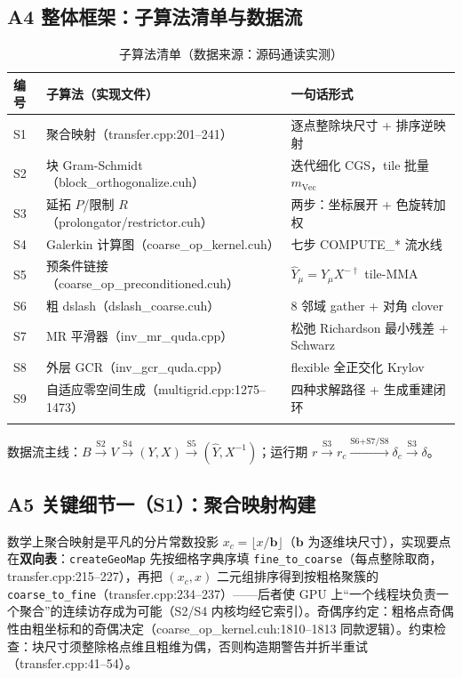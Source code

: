 \documentclass[UTF8]{ctexart}
\begin{document}
\subsection{A4 整体框架：子算法清单与数据流}

\begin{xltabular}{\textwidth}{llX}
\toprule
\textcolor{struct}{编号} & 子算法（实现文件） & \textcolor{struct}{一句话形式} \\
\midrule
\endhead
S1 & 聚合映射（transfer.cpp:201--241） & 逐点整除块尺寸 + 排序逆映射 \\
S2 & 块 Gram-Schmidt（block\_orthogonalize.cuh） & 迭代细化 CGS，tile 批量 $m_{\text{Vec}}$ \\
S3 & 延拓 $P$/限制 $R$（prolongator/restrictor.cuh） & 两步：坐标展开 + 色旋转加权 \\
S4 & Galerkin 计算图（coarse\_op\_kernel.cuh） & 七步 COMPUTE\_* 流水线 \\
S5 & 预条件链接（coarse\_op\_preconditioned.cuh） & $\hat Y_\mu=Y_\mu X^{-\dagger}$ tile-MMA \\
S6 & 粗 dslash（dslash\_coarse.cuh） & 8 邻域 gather + 对角 clover \\
S7 & MR 平滑器（inv\_mr\_quda.cpp） & 松弛 Richardson 最小残差 + Schwarz \\
S8 & 外层 GCR（inv\_gcr\_quda.cpp） & flexible 全正交化 Krylov \\
S9 & 自适应零空间生成（multigrid.cpp:1275--1473） & 四种求解路径 + 生成重建闭环 \\
\bottomrule
\caption{子算法清单（数据来源：源码通读实测）}
\end{xltabular}

数据流主线：$B\xrightarrow{\text{S2}}V\xrightarrow{\text{S4}}(Y,X)\xrightarrow{\text{S5}}(\hat Y,X^{-1})$；运行期 $r\xrightarrow{\text{S3}}r_c\xrightarrow{\text{S6+S7/S8}}\delta_c\xrightarrow{\text{S3}}\delta$。

\subsection{A5 关键细节一（S1）：聚合映射构建}

数学上聚合映射是平凡的分片常数投影 $x_c=\lfloor x/\mathbf{b}\rfloor$（$\mathbf b$ 为逐维块尺寸），实现要点在\textbf{双向表}：\texttt{createGeoMap} 先按细格字典序填 \texttt{fine\_to\_coarse}（每点整除取商，transfer.cpp:215--227），再把 $(x_c,x)$ 二元组排序得到按粗格聚簇的 \texttt{coarse\_to\_fine}（transfer.cpp:234--237）——后者使 GPU 上``一个线程块负责一个聚合''的连续访存成为可能（S2/S4 内核均经它索引）。奇偶序约定：粗格点奇偶性由粗坐标和的奇偶决定（coarse\_op\_kernel.cuh:1810--1813 同款逻辑）。约束检查：块尺寸须整除格点维且粗维为偶，否则构造期警告并折半重试（transfer.cpp:41--54）。
\end{document}
